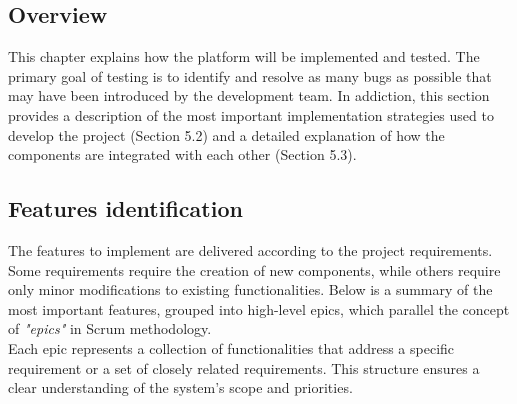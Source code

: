 \subsection{Overview}
This chapter explains how the platform will be implemented and tested. The primary goal of testing is to identify and resolve as many bugs as possible that may have been introduced by the development team. In addiction, this section provides a description of the most important implementation strategies used to develop the project (Section 5.2) and a detailed explanation of how the components are integrated with each other (Section 5.3).

\subsection{Features identification}
The features to implement are delivered according to the project requirements. Some requirements require the creation of new components, while others require only minor modifications to existing functionalities. Below is a summary of the most important features, grouped into high-level epics, which parallel the concept of \textit{"epics"} in Scrum methodology.
\\Each epic represents a collection of functionalities that address a specific requirement or a set of closely related requirements. This structure ensures a clear understanding of the system's scope and priorities.

